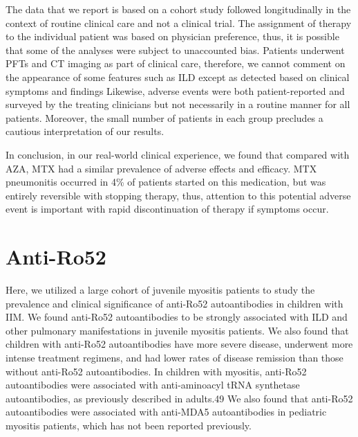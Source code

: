 The data that we report is based on a cohort study followed longitudinally in the context of routine clinical care and not a clinical trial. The assignment of therapy to the individual patient was based on physician preference, thus, it is possible that some of the analyses were subject to unaccounted bias. Patients underwent PFTs and CT imaging as part of clinical care, therefore, we cannot comment on the appearance of some features such as ILD except as detected based on clinical symptoms and findings Likewise, adverse events were both patient-reported and surveyed by the treating clinicians but not necessarily in a routine manner for all patients. Moreover, the small number of patients in each group precludes a cautious interpretation of our results.

In conclusion, in our real-world clinical experience, we found that compared with AZA, MTX had a similar prevalence of adverse effects and efficacy. MTX pneumonitis occurred in 4\% of patients started on this medication, but was entirely reversible with stopping therapy, thus, attention to this potential adverse event is important with rapid discontinuation of therapy if symptoms occur.

\section{Anti-Ro52}
Here, we utilized a large cohort of juvenile myositis patients to study the prevalence and clinical significance of anti-Ro52 autoantibodies in children with IIM. We found anti-Ro52 autoantibodies to be strongly associated with ILD and other pulmonary manifestations in juvenile myositis patients. We also found that children with anti-Ro52 autoantibodies have more severe disease, underwent more intense treatment regimens, and had lower rates of disease remission than those without anti-Ro52 autoantibodies.  In children with myositis, anti-Ro52 autoantibodies were associated with anti-aminoacyl tRNA synthetase autoantibodies, as previously described in adults.49 We also found that anti-Ro52 autoantibodies were associated with anti-MDA5 autoantibodies in pediatric myositis patients, which has not been reported previously.  

